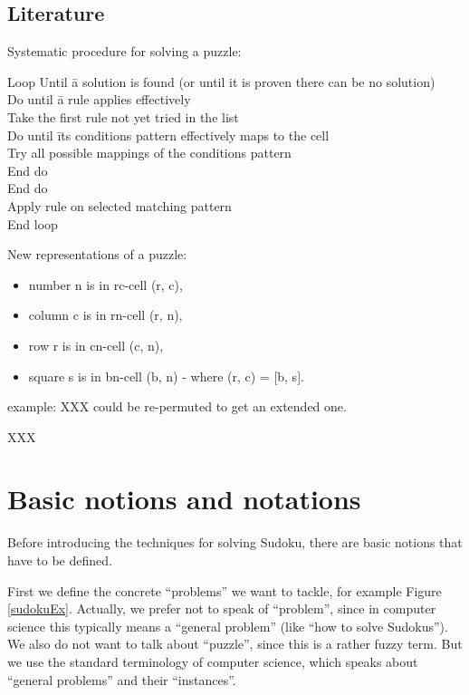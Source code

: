 \documentclass[11pt]{report}
\begin{document}
\section{Literature}
\label{sec:introLiterature}

Systematic procedure for solving a puzzle:
\begin{tabbing}
Loop Until \= a solution is found (or until it is proven there can be no solution) \\
\> Do until \= a rule applies  effectively \\
\> \> Take the first rule not yet tried in the list \\
\> \> Do until \= its conditions pattern effectively maps to the cell \\
\> \> \> Try all possible mappings of the conditions pattern \\
\> \> End do\\
\> End do\\
\> Apply rule on selected matching pattern \\
End loop\\
\end{tabbing}

New representations of a puzzle:
\begin{itemize}
\item number n is in rc-cell (r, c),
\item column c is in rn-cell (r, n),
\item row r is in cn-cell (c, n),
\item square s is in bn-cell (b, n) - where (r, c) = [b, s].
\end{itemize}

example: XXX could be re-permuted to get an extended one.

\cite{Berthier2007Sudoku} XXX





\chapter{Basic notions and notations}
\label{cha:basicnotnotat}

Before introducing the techniques for solving Sudoku, there are basic notions that have to be defined.

First we define the concrete ``problems'' we want to tackle, for example Figure \ref{sudokuEx}. Actually, we prefer not to speak of ``problem'', since in computer science this typically means a ``general problem'' (like ``how to solve Sudokus''). We also do not want to talk about ``puzzle'', since this is a rather fuzzy term. But we use the standard terminology of computer science, which speaks about ``general problems'' and their ``instances''.
\end{document}

